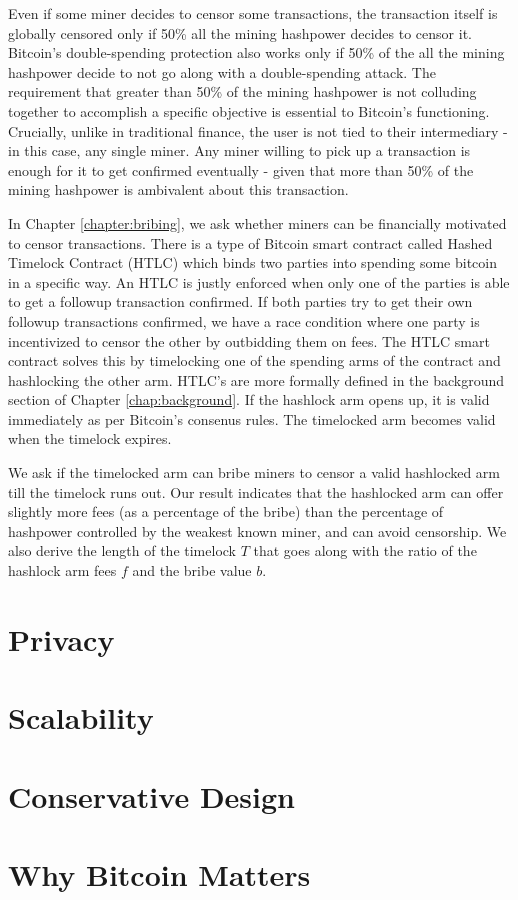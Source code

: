 Even if some miner decides to censor some transactions, the transaction itself is globally censored only if 50\% all the mining hashpower decides to censor it. Bitcoin's double-spending protection also works only if 50\% of the all the mining hashpower decide to not go along with a double-spending attack. The requirement that greater than 50\% of the mining hashpower is not colluding together to accomplish a specific objective is essential to Bitcoin's functioning. Crucially, unlike in traditional finance, the user is not tied to their intermediary - in this case, any single miner. Any miner willing to pick up a transaction is enough for it to get confirmed eventually - given that more than 50\% of the mining hashpower is ambivalent about this transaction.

In Chapter \ref{chapter:bribing}, we ask whether miners can be financially motivated to censor transactions. There is a type of Bitcoin smart contract called Hashed Timelock Contract (HTLC) which binds two parties into spending some bitcoin in a specific way. An HTLC is justly enforced when only one of the parties is able to get a followup transaction confirmed. If both parties try to get their own followup transactions confirmed, we have a race condition where one party is incentivized to censor the other by outbidding them on fees. The HTLC smart contract solves this by timelocking one of the spending arms of the contract and hashlocking the other arm. HTLC's are more formally defined in the background section of Chapter \ref{chap:background}. If the hashlock arm opens up, it is valid immediately as per Bitcoin's consenus rules. The timelocked arm becomes valid when the timelock expires. 

We ask if the timelocked arm can bribe miners to censor a valid hashlocked arm till the timelock runs out. Our result indicates that the hashlocked arm can offer slightly more fees (as a percentage of the bribe) than the percentage of hashpower controlled by the weakest known miner, and can avoid censorship. We also derive the length of the timelock $T$ that goes along with the ratio of the hashlock arm fees $f$ and the bribe value $b$.

\section{Privacy}

\section{Scalability}

\section{Conservative Design}

\section{Why Bitcoin Matters}

